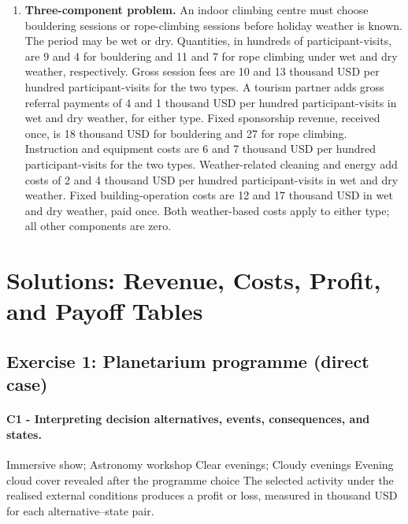 \begin{enumerate}[leftmargin=0.22in]
\item \textbf{Three-component problem.} An indoor climbing centre must choose bouldering sessions or rope-climbing sessions before holiday weather is known. The period may be wet or dry. Quantities, in hundreds of participant-visits, are 9 and 4 for bouldering and 11 and 7 for rope climbing under wet and dry weather, respectively. Gross session fees are 10 and 13 thousand USD per hundred participant-visits for the two types. A tourism partner adds gross referral payments of 4 and 1 thousand USD per hundred participant-visits in wet and dry weather, for either type. Fixed sponsorship revenue, received once, is 18 thousand USD for bouldering and 27 for rope climbing. Instruction and equipment costs are 6 and 7 thousand USD per hundred participant-visits for the two types. Weather-related cleaning and energy add costs of 2 and 4 thousand USD per hundred participant-visits in wet and dry weather. Fixed building-operation costs are 12 and 17 thousand USD in wet and dry weather, paid once. Both weather-based costs apply to either type; all other components are zero.

\end{enumerate}

	\newpage
	\newpage
	\section{Solutions: Revenue, Costs, Profit, and Payoff Tables}
	\label{sec:solutions-extraction}
\label{toc}


	\subsection{Exercise 1: Planetarium programme (direct case)}
	\label{sec:problem1-planetarium-c1-c3}
	\paragraph*{C1 - Interpreting decision alternatives, events, consequences, and states.}
	\DecisionElementsTable
{Immersive show; Astronomy workshop}
{Clear evenings; Cloudy evenings}
{Evening cloud cover revealed after the programme choice}
{The selected activity under the realised external conditions produces a profit or loss, measured in thousand USD for each alternative--state pair.}

